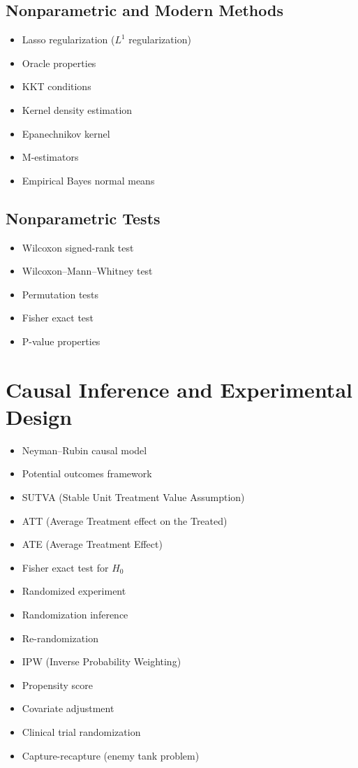 \documentclass{amsart}
\begin{document}
\subsection{Nonparametric and Modern Methods}
\begin{itemize}
  \item Lasso regularization ($L^1$ regularization)
  \item Oracle properties
  \item KKT conditions
  \item Kernel density estimation
  \item Epanechnikov kernel
  \item M-estimators
  \item Empirical Bayes normal means
\end{itemize}

\subsection{Nonparametric Tests}
\begin{itemize}
  \item Wilcoxon signed-rank test
  \item Wilcoxon--Mann--Whitney test
  \item Permutation tests
  \item Fisher exact test
  \item P-value properties
\end{itemize}

\section{Causal Inference and Experimental Design}

\begin{itemize}
  \item Neyman--Rubin causal model
  \item Potential outcomes framework
  \item SUTVA (Stable Unit Treatment Value Assumption)
  \item ATT (Average Treatment effect on the Treated)
  \item ATE (Average Treatment Effect)
  \item Fisher exact test for $H_0$
  \item Randomized experiment
  \item Randomization inference
  \item Re-randomization
  \item IPW (Inverse Probability Weighting)
  \item Propensity score
  \item Covariate adjustment
  \item Clinical trial randomization
  \item Capture-recapture (enemy tank problem)
\end{itemize}
\end{document}
